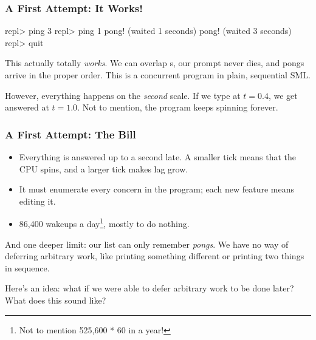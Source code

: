 \documentclass[aspectratio=169]{beamer}
\begin{document}
\begin{frame}[fragile]
  \frametitle{A First Attempt: It Works!}

  \begin{codeblock}[language={}]
repl> ping 3
repl> ping 1
pong! (waited 1 seconds)
pong! (waited 3 seconds)
repl> quit
\end{codeblock}

  \pause
  \vspace{\fill}

  This actually totally \textit{works}. We can overlap s,
  our prompt never dies, and pongs arrive in the proper order. This is
  a concurrent program in plain, sequential SML.

  \pause
  \vspace{\fill}

  However, everything happens on the \textit{second} scale. If we type
   at $t = 0.4$, we get answered at $t = 1.0$. Not to mention,
  the program keeps spinning forever.
\end{frame}

\begin{frame}[fragile]
  \frametitle{A First Attempt: The Bill}

  \begin{itemize}
    \item {} Everything is answered up
      to a second late. A smaller tick means that the CPU spins, and
      a larger tick makes lag grow.
    \pause
    \item {} It must enumerate every
      concern in the program; each new feature means editing it.
    \pause
    \item 86{,}400 wakeups a day\footnote{Not to mention 525,600 * 60 in a year!}, mostly to do nothing.
  \end{itemize}

  \pause
  \vspace{\fill}

  And one deeper limit: our list can only remember \textit{pongs}. We
  have no way of deferring arbitrary work, like printing something
  different or printing two things in sequence.

  \pause
  \vspace{\fill}

  Here's an idea: what if we were able to defer arbitrary work to
  be done later? What does this sound like?
\end{frame}
\end{document}
